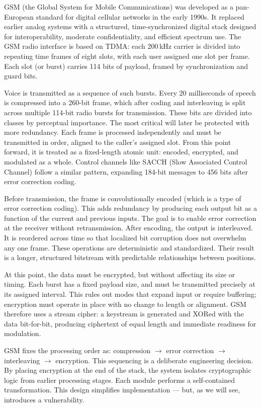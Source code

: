 GSM (the Global System for Mobile Communications) was developed as a pan-European standard for digital cellular networks in the early 1990s. It replaced earlier analog systems with a structured, time-synchronized digital stack designed for interoperability, moderate confidentiality, and efficient spectrum use. The GSM radio interface is based on TDMA: each 200 kHz carrier is divided into repeating time frames of eight slots, with each user assigned one slot per frame. Each slot (or burst) carries 114 bits of payload, framed by synchronization and guard bits.

Voice is transmitted as a sequence of such bursts. Every 20 milliseconds of speech is compressed into a 260-bit frame, which after coding and interleaving is split across multiple 114-bit radio bursts for transmission. These bits are divided into classes by perceptual importance. The most critical will later be protected with more redundancy. Each frame is processed independently and must be transmitted in order, aligned to the caller’s assigned slot. From this point forward, it is treated as a fixed-length atomic unit: encoded, encrypted, and modulated as a whole. Control channels like SACCH (Slow Associated Control Channel) follow a similar pattern, expanding 184-bit messages to 456 bits after error correction coding.

Before transmission, the frame is convolutionally encoded (which is a type of error correction coding). This adds redundancy by producing each output bit as a function of the current and previous inputs. The goal is to enable error correction at the receiver without retransmission. After encoding, the output is interleaved. It is reordered across time so that localized bit corruption does not overwhelm any one frame. These operations are deterministic and standardized. Their result is a longer, structured bitstream with predictable relationships between positions.

At this point, the data must be encrypted, but without affecting its size or timing. Each burst has a fixed payload size, and must be transmitted precisely at its assigned interval. This rules out modes that expand input or require buffering; encryption must operate in place with no change to length or alignment. GSM therefore uses a stream cipher: a keystream is generated and XORed with the data bit-for-bit, producing ciphertext of equal length and immediate readiness for modulation.

GSM fixes the processing order as: compression $\rightarrow$ error correction $\rightarrow$ interleaving $\rightarrow$ encryption. This sequencing is a deliberate engineering decision. By placing encryption at the end of the stack, the system isolates cryptographic logic from earlier processing stages. Each module performs a self-contained transformation. This design simplifies implementation — but, as we will see, introduces a vulnerability.

